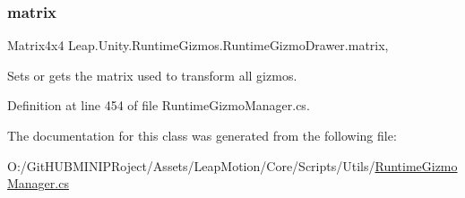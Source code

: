 \subsubsection{\texorpdfstring{matrix}{matrix}}
{\footnotesize\ttfamily Matrix4x4 Leap.\+Unity.\+Runtime\+Gizmos.\+Runtime\+Gizmo\+Drawer.\+matrix\hspace{0.3cm}{\ttfamily [get]}, {\ttfamily [set]}}



Sets or gets the matrix used to transform all gizmos. 



Definition at line 454 of file Runtime\+Gizmo\+Manager.\+cs.



The documentation for this class was generated from the following file\+:\begin{DoxyCompactItemize}
\item 
O\+:/\+Git\+H\+U\+B\+M\+I\+N\+I\+P\+Roject/\+Assets/\+Leap\+Motion/\+Core/\+Scripts/\+Utils/\mbox{\hyperlink{_runtime_gizmo_manager_8cs}{Runtime\+Gizmo\+Manager.\+cs}}\end{DoxyCompactItemize}
